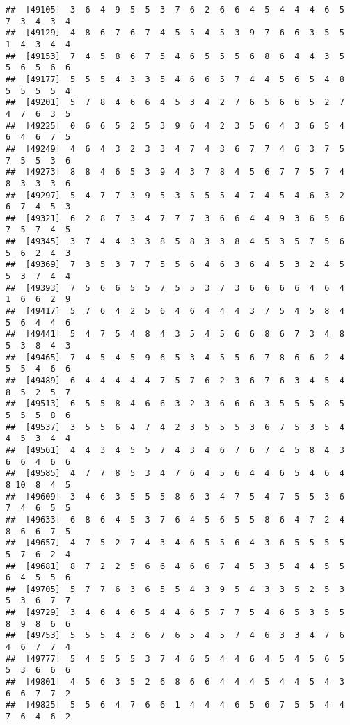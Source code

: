 \documentclass[
]{book}
\begin{document}
\begin{verbatim}
##  [49105]  3  6  4  9  5  5  3  7  6  2  6  6  4  5  4  4  4  6  5  7  3  4  3  4
##  [49129]  4  8  6  7  6  7  4  5  5  4  5  3  9  7  6  6  3  5  5  1  4  3  4  4
##  [49153]  7  4  5  8  6  7  5  4  6  5  5  5  6  8  6  4  4  3  5  5  6  5  6  6
##  [49177]  5  5  5  4  3  3  5  4  6  6  5  7  4  4  5  6  5  4  8  5  5  5  5  4
##  [49201]  5  7  8  4  6  6  4  5  3  4  2  7  6  5  6  6  5  2  7  4  7  6  3  5
##  [49225]  0  6  6  5  2  5  3  9  6  4  2  3  5  6  4  3  6  5  4  6  4  6  7  5
##  [49249]  4  6  4  3  2  3  3  4  7  4  3  6  7  7  4  6  3  7  5  7  5  5  3  6
##  [49273]  8  8  4  6  5  3  9  4  3  7  8  4  5  6  7  7  5  7  4  8  3  3  3  6
##  [49297]  5  4  7  7  3  9  5  3  5  5  5  4  7  4  5  4  6  3  2  6  7  4  5  3
##  [49321]  6  2  8  7  3  4  7  7  7  3  6  6  4  4  9  3  6  5  6  7  5  7  4  5
##  [49345]  3  7  4  4  3  3  8  5  8  3  3  8  4  5  3  5  7  5  6  5  6  2  4  3
##  [49369]  7  3  5  3  7  7  5  5  6  4  6  3  6  4  5  3  2  4  5  5  3  7  4  4
##  [49393]  7  5  6  6  5  5  7  5  5  3  7  3  6  6  6  6  4  6  4  1  6  6  2  9
##  [49417]  5  7  6  4  2  5  6  4  6  4  4  4  3  7  5  4  5  8  4  5  6  4  4  6
##  [49441]  5  4  7  5  4  8  4  3  5  4  5  6  6  8  6  7  3  4  8  5  3  8  4  3
##  [49465]  7  4  5  4  5  9  6  5  3  4  5  5  6  7  8  6  6  2  4  5  5  4  6  6
##  [49489]  6  4  4  4  4  4  7  5  7  6  2  3  6  7  6  3  4  5  4  8  5  2  5  7
##  [49513]  6  5  5  8  4  6  6  3  2  3  6  6  6  3  5  5  5  8  5  5  5  5  8  6
##  [49537]  3  5  5  6  4  7  4  2  3  5  5  5  3  6  7  5  3  5  4  4  5  3  4  4
##  [49561]  4  4  3  4  5  5  7  4  3  4  6  7  6  7  4  5  8  4  3  6  6  4  6  6
##  [49585]  4  7  7  8  5  3  4  7  6  4  5  6  4  4  6  5  4  6  4  8 10  8  4  5
##  [49609]  3  4  6  3  5  5  5  8  6  3  4  7  5  4  7  5  5  3  6  7  4  6  5  5
##  [49633]  6  8  6  4  5  3  7  6  4  5  6  5  5  8  6  4  7  2  4  8  6  6  7  5
##  [49657]  4  7  5  2  7  4  3  4  6  5  5  6  4  3  6  5  5  5  5  5  7  6  2  4
##  [49681]  8  7  2  2  5  6  6  4  6  6  7  4  5  3  5  4  4  5  5  6  4  5  5  6
##  [49705]  5  7  7  6  3  6  5  5  4  3  9  5  4  3  3  5  2  5  3  5  3  6  7  7
##  [49729]  3  4  6  4  6  5  4  4  6  5  7  7  5  4  6  5  3  5  5  8  9  8  6  6
##  [49753]  5  5  5  4  3  6  7  6  5  4  5  7  4  6  3  3  4  7  6  4  6  7  7  4
##  [49777]  5  4  5  5  5  3  7  4  6  5  4  4  6  4  5  4  5  6  5  5  3  6  6  6
##  [49801]  4  5  6  3  5  2  6  8  6  6  4  4  4  5  4  4  5  4  3  6  6  7  7  2
##  [49825]  5  5  6  4  7  6  6  1  4  4  4  6  5  6  7  5  5  4  4  7  6  4  6  2

\end{verbatim}
\end{document}
